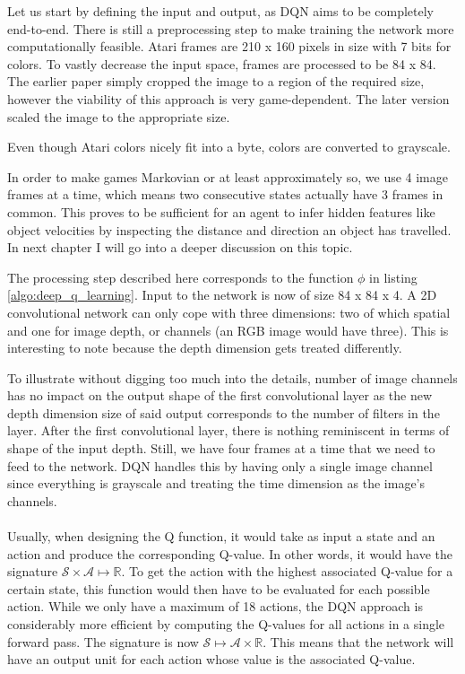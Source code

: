 Let us start by defining the input and output,
as DQN aims to be completely end-to-end.
There is still a preprocessing step to make training
the network more computationally feasible.
Atari frames are 210 x 160 pixels in size
with 7 bits for colors.
To vastly decrease the input space,
frames are processed to be 84 x 84.
The earlier paper simply cropped the image to
a region of the required size,
however the viability of this approach
is very game-dependent.
The later version scaled the image to the appropriate size.

Even though Atari colors nicely fit into a byte,
colors are converted to grayscale.

In order to make games Markovian or at least approximately so,
we use 4 image frames at a time,
which means two consecutive states
actually have 3 frames in common.
This proves to be sufficient for an agent to infer hidden features
like object velocities by inspecting the distance and direction
an object has travelled.
In next chapter I will go into a deeper discussion on this topic.

The processing step described here corresponds to
the function $\phi$ in listing \ref{algo:deep_q_learning}.
Input to the network is now of size 84 x 84 x 4.
A 2D convolutional network can only cope with three dimensions:
two of which spatial and one for image depth,
or channels (an RGB image would have three).
This is interesting to note because the depth dimension
gets treated differently.

To illustrate without digging too much into the details,
number of image channels has no impact on the output shape of the
first convolutional layer as the new depth dimension size
of said output corresponds to the number of filters in the layer.
After the first convolutional layer,
there is nothing reminiscent in terms of shape
of the input depth.
Still, we have four frames at a time that we need to feed to the network.
DQN handles this by having only a single image channel
since everything is grayscale
and treating the time dimension as the image's channels.

\paragraph{}
Usually, when designing the Q function,
it would take as input a state and an action and produce
the corresponding Q-value.
In other words,
it would have the signature
$\mathcal{S} \times \mathcal{A} \mapsto \mathbb{R}$.
To get the action with the highest associated Q-value
for a certain state,
this function would then have to be evaluated
for each possible action.
While we only have a maximum of 18 actions,
the DQN approach is considerably more efficient
by computing the Q-values for all actions in a single forward pass.
The signature is now
$\mathcal{S} \mapsto \mathcal{A} \times \mathbb{R}$.
This means that the network will have an output unit
for each action whose value is the associated Q-value.

